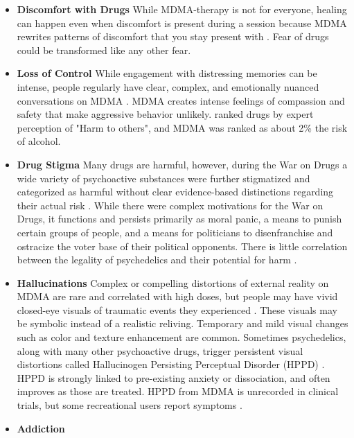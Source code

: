 \documentclass[12pt,letterpaper]{book}
\begin{document}
\begin{itemize}
    \item \textbf{Discomfort with Drugs}
     While MDMA-therapy is not for everyone, healing can happen even when discomfort is present during a session because MDMA rewrites patterns of discomfort that you stay present with \cite{fedduciaMDMAMemoryReconsolidation}. Fear of drugs could be transformed like any other fear.
    \item \textbf{Loss of Control}
        While engagement with distressing memories can be intense, people regularly have clear, complex, and emotionally nuanced conversations on MDMA \cite{colbertEvenings,passieHistory}. MDMA creates intense feelings of compassion and safety that make aggressive behavior unlikely. \textcite{nuttDrugHarms} ranked drugs by expert perception of "Harm to others", and MDMA was ranked as about 2\% the risk of alcohol.
    \item \textbf{Drug Stigma}
        Many drugs are harmful, however, during the War on Drugs a wide variety of psychoactive substances were further stigmatized and categorized as harmful without clear evidence-based distinctions regarding their actual risk \cite{alexanderNewJimCrow,nuttDrugHarms}. While there were complex motivations for the War on Drugs, it functions and persists primarily as moral panic, a means to punish certain groups of people, and a means for politicians to disenfranchise and ostracize the voter base of their political opponents. There is little correlation between the legality of psychedelics and their potential for harm \cite{nuttDrugHarms}.
    \item \textbf{Hallucinations}
        Complex or compelling distortions of external reality on MDMA are rare and correlated with high doses, but people may have vivid closed-eye visuals of traumatic events they experienced \cite{liechtiGender}. These visuals may be symbolic instead of a realistic reliving. Temporary and mild visual changes such as color and texture enhancement are common. Sometimes psychedelics, along with many other psychoactive drugs, trigger persistent visual distortions called Hallucinogen Persisting Perceptual Disorder (HPPD) \cite{alexanderHPPD,halpernHPPD}. HPPD is strongly linked to pre-existing anxiety or dissociation, and often improves as those are treated. HPPD from MDMA is unrecorded in clinical trials, but some recreational users report symptoms \cite{vizeliActuteEffects,litjensHPPD}.
    \item \textbf{Addiction}

\end{itemize}
\end{document}
